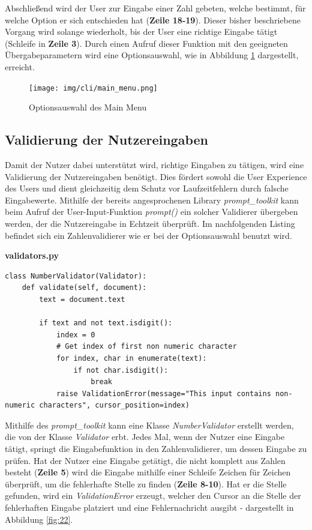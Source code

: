 \documentclass[oneside]{ausarbeitung}
\begin{document}
Abschließend wird der User zur Eingabe einer Zahl gebeten, welche bestimmt, für welche Option er sich entschieden hat (\textbf{Zeile 18-19}). Dieser bisher beschriebene Vorgang wird solange wiederholt, bis der User eine richtige Eingabe tätigt (Schleife in \textbf{Zeile 3}). Durch einen Aufruf dieser Funktion mit den geeigneten Übergabeparametern wird eine Optionsauswahl, wie in Abbildung \ref{fig:21} dargestellt, erreicht. 

\begin{figure}[H]
  \centering
  \texttt{[image: img/cli/main\_menu.png]}
  \caption{Optionsauswahl des Main Menu}
  \label{fig:21}
\end{figure}

\subsection{Validierung der Nutzereingaben}
\label{sub:validierung_der_nutzereingaben}

Damit der Nutzer dabei unterstützt wird, richtige Eingaben zu tätigen, wird eine Validierung der Nutzereingaben benötigt. Dies fördert sowohl die User Experience des Users und dient gleichzeitig dem Schutz vor Laufzeitfehlern durch falsche Eingabewerte. Mithilfe der bereits angesprochenen Library \textit{prompt\_toolkit} kann beim Aufruf der User-Input-Funktion \textit{prompt()} ein solcher Validierer übergeben werden, der die Nutzereingabe in Echtzeit überprüft. Im nachfolgenden Listing befindet sich ein Zahlenvalidierer wie er bei der Optionsauswahl benutzt wird.

\lstset{language=Python}
\lstset{frame=lines}
\lstset{basicstyle=\footnotesize}
\textbf{validators.py}
\begin{lstlisting}
class NumberValidator(Validator):
	def validate(self, document):
		text = document.text

		if text and not text.isdigit():
			index = 0
			# Get index of first non numeric character
			for index, char in enumerate(text):
				if not char.isdigit():
					break
			raise ValidationError(message="This input contains non-numeric characters", cursor_position=index)
\end{lstlisting}

Mithilfe des \textit{prompt\_toolkit} kann eine Klasse \textit{NumberValidator} erstellt werden, die von der Klasse \textit{Validator} erbt. Jedes Mal, wenn der Nutzer eine Eingabe tätigt, springt die Eingabefunktion in den Zahlenvalidierer, um dessen Eingabe zu prüfen. Hat der Nutzer eine Eingabe getätigt, die nicht komplett aus Zahlen besteht (\textbf{Zeile 5}) wird die Eingabe mithilfe einer Schleife Zeichen für Zeichen überprüft, um die fehlerhafte Stelle zu finden (\textbf{Zeile 8-10}). Hat er die Stelle gefunden, wird ein \textit{ValidationError} erzeugt, welcher den Cursor an die Stelle der fehlerhaften Eingabe platziert und eine Fehlernachricht ausgibt - dargestellt in Abbildung \ref{fig:22}.
\end{document}
